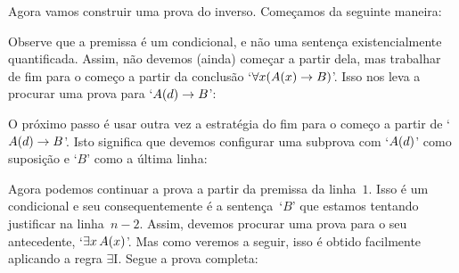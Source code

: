  
\begin{fitchproof}
	\open
	\open
	\close
	\close
\end{fitchproof}

Agora vamos construir uma prova do inverso. Come\c camos da seguinte maneira:
\begin{fitchproof}
	\ellipsesline
\end{fitchproof}
Observe que a premissa \'e um condicional, e n\~ao uma senten\c ca  existencialmente quantificada. Assim, n\~ao devemos (ainda) come\c car a partir  dela,  mas trabalhar de fim para o come\c co a partir da conclus\~ao `$\forall x(\mathord{A}(x) \rightarrow B)$'. Isso nos leva a procurar uma prova para `$\mathord{A}(d) \rightarrow B$':
\begin{fitchproof}
	\ellipsesline
\end{fitchproof}
O pr\'oximo passo \'e usar outra vez a estrat\'egia do fim para o come\c co a partir de  `$\mathord{A}(d) \rightarrow B$'.  Isto significa que devemos configurar uma subprova  com  `$\mathord{A}(d)$' como suposi\c c\~ao  e `$B$' como a \'ultima linha:  
 
\begin{fitchproof}
	\open
	\ellipsesline
	\close
\end{fitchproof}
Agora podemos continuar a prova a partir da premissa da linha~$1$. Isso \'e um condicional e seu consequentemente \'e a senten\c ca~`$B$' que estamos tentando justificar na linha~$n-2$. Assim, devemos procurar uma prova para o seu antecedente, `$\exists x\,\mathord{A}(x)$'. Mas  como veremos a seguir, isso \'e obtido  facilmente aplicando a regra  $\exists$I.   Segue a prova completa:\begin{fitchproof}
	\open
	\close
\end{fitchproof}

